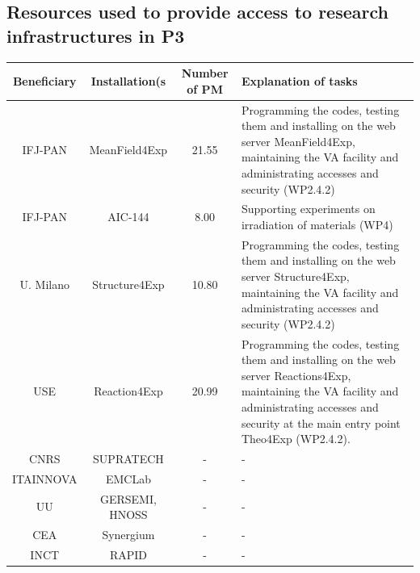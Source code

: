 %
\subsection{Resources used to provide access to research infrastructures in P3}


\begin{table}[H]
\centering
{\color{black}\begin{tabularx}{\textwidth}{|c|c|c|X|} \hline
    \rowcolor{mycyan}
    {\bf Beneficiary} & {\bf Installation(s} & {\bf Number of PM}  & {\bf Explanation of tasks} \\ \hline
    IFJ-PAN & MeanField4Exp & 21.55 & Programming the codes, testing them and installing on the web server MeanField4Exp, maintaining the VA facility and administrating accesses and security (WP2.4.2)\\ \hline
    IFJ-PAN & AIC-144 & 8.00 & Supporting experiments on irradiation of materials (WP4)\\ \hline
    U. Milano & Structure4Exp & 10.80 & Programming the codes, testing them and installing on the web server Structure4Exp, maintaining the VA facility and administrating accesses and security (WP2.4.2)\\ \hline 
   USE & Reaction4Exp & 20.99 & Programming the codes, testing them and installing on the web server Reactions4Exp, maintaining the VA facility and administrating accesses and security at the main entry point Theo4Exp (WP2.4.2).  \\ \hline
   CNRS & SUPRATECH & - & - \\ \hline
   ITAINNOVA & EMCLab & - & - \\ \hline
   UU & GERSEMI, HNOSS & - & - \\ \hline
   CEA & Synergium & - & - \\ \hline
   INCT & RAPID & - & - \\ \hline
   
\end{tabularx}}
\label{tab:resources}
\end{table}



